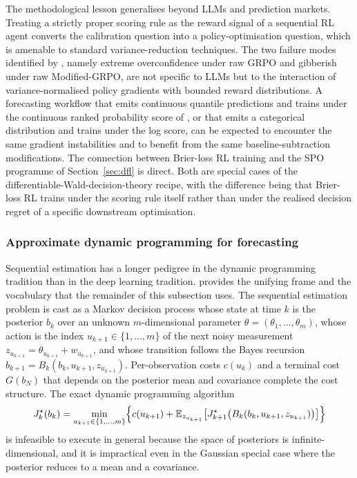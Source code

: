 The methodological lesson generalises beyond LLMs and prediction markets. Treating
a strictly proper scoring rule as the reward signal of a sequential RL agent
converts the calibration question into a policy-optimisation question, which is
amenable to standard variance-reduction techniques. The two failure modes
identified by \citet{Turtel2025}, namely extreme overconfidence under raw GRPO and
gibberish under raw Modified-GRPO, are not specific to LLMs but to the interaction
of variance-normalised policy gradients with bounded reward distributions. A
forecasting workflow that emits continuous quantile predictions and trains under
the continuous ranked probability score of \citet{GneitingRaftery2007}, or that
emits a categorical distribution and trains under the log score, can be expected
to encounter the same gradient instabilities and to benefit from the same
baseline-subtraction modifications. The connection between Brier-loss RL training
and the SPO programme of Section~\ref{sec:dfl} is direct. Both are special cases
of the differentiable-Wald-decision-theory recipe, with the difference being that
Brier-loss RL trains under the scoring rule itself rather than under the realised
decision regret of a specific downstream optimisation.

\subsubsection{Approximate dynamic programming for forecasting}
\label{sec:adp_forecasting}

Sequential estimation has a longer pedigree in the dynamic programming tradition
than in the deep learning tradition. \citet{BertsekasRollout2022} provides the
unifying frame and the vocabulary that the remainder of this subsection uses. The
sequential estimation problem is cast as a Markov decision process whose state at
time $k$ is the posterior $b_k$ over an unknown $m$-dimensional parameter
$\theta = (\theta_1, \dots, \theta_m)$, whose action is the index $u_{k+1} \in
\{1, \dots, m\}$ of the next noisy measurement $z_{u_{k+1}} = \theta_{u_{k+1}} +
w_{u_{k+1}}$, and whose transition follows the Bayes recursion
$b_{k+1} = B_k(b_k, u_{k+1}, z_{u_{k+1}})$. Per-observation costs $c(u_k)$ and a
terminal cost $G(b_N)$ that depends on the posterior mean and covariance complete
the cost structure. The exact dynamic programming algorithm
\begin{equation}
J^\star_k(b_k) = \min_{u_{k+1} \in \{1, \dots, m\}}
  \Bigl\{ c(u_{k+1}) + \mathbb E_{z_{u_{k+1}}}\bigl[
    J^\star_{k+1}\bigl(B_k(b_k, u_{k+1}, z_{u_{k+1}})\bigr)
  \bigr] \Bigr\}
\label{eq:bertsekas_dp}
\end{equation}
is infeasible to execute in general because the space of posteriors is
infinite-dimensional, and it is impractical even in the Gaussian special case
where the posterior reduces to a mean and a covariance.

